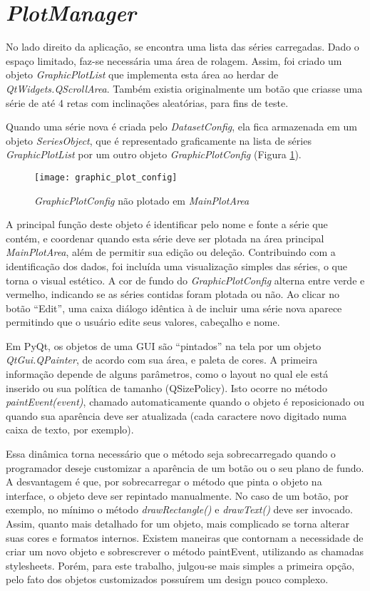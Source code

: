 
\section{\emph{PlotManager}}

No lado direito da aplicação, se encontra uma lista das séries carregadas. Dado o espaço limitado, faz-se necessária uma área de rolagem. Assim, foi criado um objeto \emph{GraphicPlotList} que implementa esta área ao herdar de \emph{QtWidgets.QScrollArea}. Também existia originalmente um botão que criasse uma série de até 4 retas com inclinações aleatórias, para fins de teste.

Quando uma série nova é criada pelo \emph{DatasetConfig}, ela fica armazenada em um objeto \emph{SeriesObject}, que é representado graficamente na lista de séries \emph{GraphicPlotList} por um outro objeto \emph{GraphicPlotConfig} (Figura \ref{img_graphic_plot_config}).

\begin{figure}[hbt]
	\centering
	\texttt{[image: graphic\_plot\_config]}
	\caption{\emph{GraphicPlotConfig} não plotado em \emph{MainPlotArea}}
	\label{img_graphic_plot_config}
\end{figure}

A principal função deste objeto é identificar pelo nome e fonte a série que contém, e coordenar quando esta série deve ser plotada na área principal \emph{MainPlotArea}, além de permitir sua edição ou deleção. Contribuindo com a identificação dos dados, foi incluída uma visualização simples das séries, o que torna o visual estético. A cor de fundo do \emph{GraphicPlotConfig} alterna entre verde e vermelho, indicando se as séries contidas foram plotada ou não. Ao clicar no botão “Edit”, uma caixa diálogo idêntica à de incluir uma série nova aparece permitindo que o usuário edite seus valores, cabeçalho e nome.

Em PyQt, os objetos de uma GUI são “pintados” na tela por um objeto \emph{QtGui.QPainter}, de acordo com sua área, e paleta de cores. A primeira informação depende de alguns parâmetros, como o layout no qual ele está inserido ou sua política de tamanho (QSizePolicy). Isto ocorre no método \emph{paintEvent(event)}, chamado automaticamente quando o objeto é reposicionado ou quando sua aparência deve ser atualizada (cada caractere novo digitado numa caixa de texto, por exemplo).

Essa dinâmica torna necessário que o método seja sobrecarregado quando o programador deseje customizar a aparência de um botão ou o seu plano de fundo. A desvantagem é que, por sobrecarregar o método que pinta o objeto na interface, o objeto deve ser repintado manualmente. No caso de um botão, por exemplo, no mínimo o método \emph{drawRectangle()} e \emph{drawText()} deve ser invocado. Assim, quanto mais detalhado for um objeto, mais complicado se torna alterar suas cores e formatos internos. Existem maneiras que contornam a necessidade de criar um novo objeto e sobrescrever o método paintEvent, utilizando as chamadas stylesheets. Porém, para este trabalho, julgou-se mais simples a primeira opção, pelo fato dos objetos customizados possuírem um design pouco complexo.

